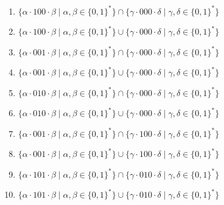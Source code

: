 \documentclass[12pt]{article}
\begin{document}
\begin{enumerate}
\begin{enumerate}[label=\arabic*)]
    \item $\{ \alpha \cdot 100 \cdot \beta \mid \alpha, \beta \in \{0, 1\}^*\} \cap \{\gamma \cdot 000 \cdot \delta \mid \gamma, \delta \in \{0, 1\}^* \}$
    \item $\{ \alpha \cdot 100 \cdot \beta \mid \alpha, \beta \in \{0, 1\}^*\} \cup \{\gamma \cdot 000 \cdot \delta \mid \gamma, \delta \in \{0, 1\}^* \}$
    \item $\{ \alpha \cdot 001 \cdot \beta \mid \alpha, \beta \in \{0, 1\}^*\} \cap \{\gamma \cdot 000 \cdot \delta \mid \gamma, \delta \in \{0, 1\}^* \}$
    \item $\{ \alpha \cdot 001 \cdot \beta \mid \alpha, \beta \in \{0, 1\}^*\} \cup \{\gamma \cdot 000 \cdot \delta \mid \gamma, \delta \in \{0, 1\}^* \}$
    \item $\{ \alpha \cdot 010 \cdot \beta \mid \alpha, \beta \in \{0, 1\}^*\} \cap \{\gamma \cdot 000 \cdot \delta \mid \gamma, \delta \in \{0, 1\}^* \}$
    \item $\{ \alpha \cdot 010 \cdot \beta \mid \alpha, \beta \in \{0, 1\}^*\} \cup \{\gamma \cdot 000 \cdot \delta \mid \gamma, \delta \in \{0, 1\}^* \}$
    \item $\{ \alpha \cdot 001 \cdot \beta \mid \alpha, \beta \in \{0, 1\}^*\} \cap \{\gamma \cdot 100 \cdot \delta \mid \gamma, \delta \in \{0, 1\}^* \}$
    \item $\{ \alpha \cdot 001 \cdot \beta \mid \alpha, \beta \in \{0, 1\}^*\} \cup \{\gamma \cdot 100 \cdot \delta \mid \gamma, \delta \in \{0, 1\}^* \}$
    \item $\{ \alpha \cdot 101 \cdot \beta \mid \alpha, \beta \in \{0, 1\}^*\} \cap \{\gamma \cdot 010 \cdot \delta \mid \gamma, \delta \in \{0, 1\}^* \}$
    \item $\{ \alpha \cdot 101 \cdot \beta \mid \alpha, \beta \in \{0, 1\}^*\} \cup \{\gamma \cdot 010 \cdot \delta \mid \gamma, \delta \in \{0, 1\}^* \}$


\end{enumerate}
\end{enumerate}
\end{document}
